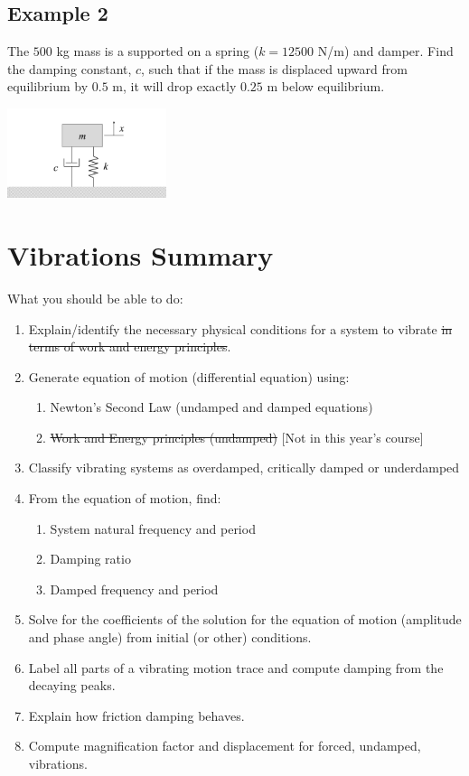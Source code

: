 \documentclass[12pt,letterpaper,twoside]{report}
\begin{document}
\newpage

\subsection{Example 2}
The $500$ kg mass is a supported on a spring ($k = 12500$ N/m) and damper.  Find the damping constant, $c$, such that if the mass is displaced upward from equilibrium by $0.5$ m, it will drop exactly $0.25$ m below equilibrium.  

\includegraphics[trim={7cm 1cm 6cm 2cm},clip,width=0.35\textwidth, left]{Slide98}

\newpage



\section{Vibrations Summary}

What you should be able to do:

\begin{enumerate}
\item Explain/identify the necessary physical conditions for a system to vibrate \sout{in terms of work and energy principles}.
\item Generate equation of motion (differential equation) using:
\begin{enumerate}
\item Newton’s Second Law (undamped and damped equations)
\item \sout{Work and Energy principles (undamped)} [Not in this year's course]
\end{enumerate}
\item Classify vibrating systems as overdamped, critically damped or underdamped
\item From the equation of motion, find:
\begin{enumerate}
\item System natural frequency and period
\item Damping ratio
\item Damped frequency and period
\end{enumerate}
\item Solve for the coefficients of the solution for the equation of motion (amplitude and phase angle) from initial (or other) conditions.
\item Label all parts of a vibrating motion trace and compute damping from the decaying peaks.
\item Explain how friction damping behaves.
\item Compute magnification factor and displacement for forced, undamped, vibrations.
\end{enumerate}
\end{document}
